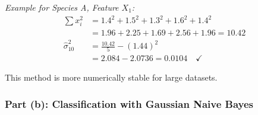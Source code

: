 \documentclass[12pt]{article}
\begin{document}
\begin{explanation}
\textit{Example for Species A, Feature $X_1$:}
\begin{align}
\sum x_i^2 &= 1.4^2 + 1.5^2 + 1.3^2 + 1.6^2 + 1.4^2 \\
&= 1.96 + 2.25 + 1.69 + 2.56 + 1.96 = 10.42 \\
\hat{\sigma}_{10}^2 &= \frac{10.42}{5} - (1.44)^2 \\
&= 2.084 - 2.0736 = 0.0104 \quad \checkmark
\end{align}

This method is more numerically stable for large datasets.
\end{explanation}

\subsubsection{Part (b): Classification with Gaussian Naive Bayes}
\end{document}

